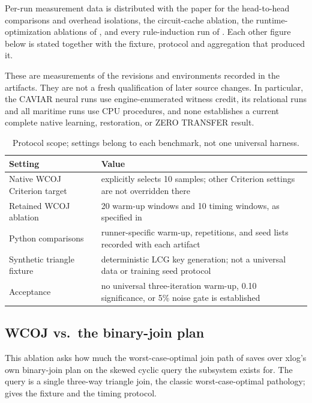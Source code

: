 Per-run measurement data is distributed with the paper for the head-to-head comparisons and overhead isolations, the circuit-cache ablation, the runtime-optimization ablations of , and every rule-induction run of . Each other figure below is stated together with the fixture, protocol and aggregation that produced it.

These are measurements of the revisions and environments recorded in the artifacts. They are not a fresh qualification of later source changes. In particular, the CAVIAR neural runs use engine-enumerated witness credit, its relational runs and all maritime runs use CPU procedures, and none establishes a current complete native learning, restoration, or ZERO TRANSFER result.

\begin{table}[htbp]
  \centering
  \caption{Protocol scope; settings belong to each benchmark, not one universal harness.}
  \label{tab:stat-protocol}
  \small
  \begin{tabularx}{\linewidth}{@{}lL@{}}
    \toprule
    \textbf{Setting} & \textbf{Value} \\
    \midrule
    Native WCOJ Criterion target & explicitly selects 10 samples; other Criterion settings are not overridden there \\
    Retained WCOJ ablation & 20 warm-up windows and 10 timing windows, as specified in  \\
    Python comparisons & runner-specific warm-up, repetitions, and seed lists recorded with each artifact \\
    Synthetic triangle fixture & deterministic LCG key generation; not a universal data or training seed protocol \\
    Acceptance & no universal three-iteration warm-up, 0.10 significance, or 5\% noise gate is established \\
    \bottomrule
  \end{tabularx}
\end{table}

\subsection{WCOJ vs.\ the binary-join plan}\label{sec:wcoj-eval}

This ablation asks how much the worst-case-optimal join path of  saves over xlog's own binary-join plan on the skewed cyclic query the subsystem exists for. The query is a single three-way triangle join, the classic worst-case-optimal pathology;  gives the fixture and the timing protocol.

